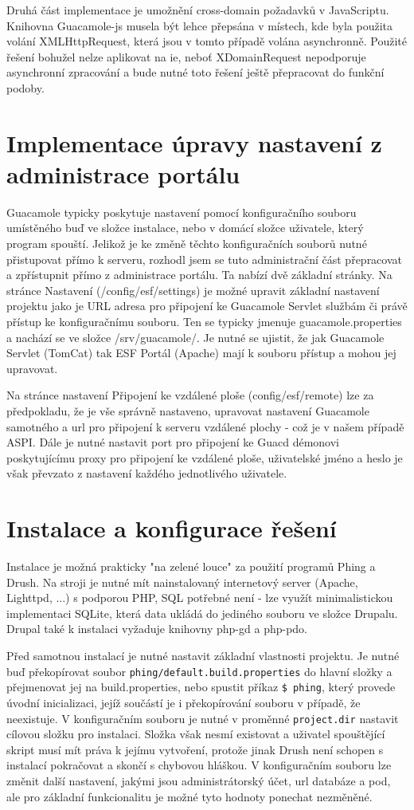 Druhá část implementace je umožnění cross-domain požadavků v JavaScriptu. Knihovna Guacamole-js musela být lehce přepsána v místech, kde byla použita volání XMLHttpRequest, která jsou v tomto případě volána asynchronně. Použité řešení bohužel nelze aplikovat na \gls{ie}, neboť XDomainRequest nepodporuje asynchronní zpracování a bude nutné toto řešení ještě přepracovat do funkční podoby.

\section{Implementace úpravy nastavení z administrace portálu}
Guacamole typicky poskytuje nastavení pomocí konfiguračního souboru umístěného buď ve složce instalace, nebo v domácí složce uživatele, který program spouští. Jelikož je ke změně těchto konfiguračních souborů nutné přistupovat přímo k serveru, rozhodl jsem se tuto administrační část přepracovat a zpřístupnit přímo z administrace portálu. Ta nabízí dvě základní stránky. Na stránce Nastavení (/config/esf/settings) je možné upravit základní nastavení projektu jako je URL adresa pro připojení ke Guacamole Servlet službám či právě přístup ke konfiguračnímu souboru. Ten se typicky jmenuje guacamole.properties a nachází se ve složce /srv/guacamole/. Je nutné se ujistit, že jak Guacamole Servlet (TomCat) tak ESF Portál (Apache) mají k souboru přístup a mohou jej upravovat.

Na stránce nastavení Připojení ke vzdálené ploše (config/esf/remote) lze za předpokladu, že je vše správně nastaveno, upravovat nastavení Guacamole samotného a url pro připojení k serveru vzdálené plochy - což je v našem případě ASPI. Dále je nutné nastavit port pro připojení ke Guacd démonovi poskytujícímu proxy pro připojení ke vzdálené ploše, uživatelské jméno a heslo je však převzato z nastavení každého jednotlivého uživatele.

\section{Instalace a konfigurace řešení}
Instalace je možná prakticky "na zelené louce" za použití programů Phing a Drush. Na stroji je nutné mít nainstalovaný internetový server (Apache, Lighttpd, ...) s podporou PHP, SQL potřebné není - lze využít minimalistickou implementaci SQLite, která data ukládá do jediného souboru ve složce Drupalu. Drupal také k instalaci vyžaduje knihovny php-gd a php-pdo.

Před samotnou instalací je nutné nastavit základní vlastnosti projektu. Je nutné buď překopírovat soubor \texttt{phing/default.build.properties} do hlavní složky a přejmenovat jej na build.properties, nebo spustit příkaz \texttt{\$~phing}, který provede úvodní inicializaci, jejíž součástí je i překopírování souboru v případě, že neexistuje. V konfiguračním souboru je nutné v proměnné \texttt{project.dir} nastavit cílovou složku pro instalaci. Složka však nesmí existovat a uživatel spouštějící skript musí mít práva k jejímu vytvoření, protože jinak Drush není schopen s instalací pokračovat a skončí s chybovou hláškou. V konfiguračním souboru lze změnit další nastavení, jakými jsou administrátorský účet, url databáze a pod, ale pro základní funkcionalitu je možné tyto hodnoty ponechat nezměněné.

